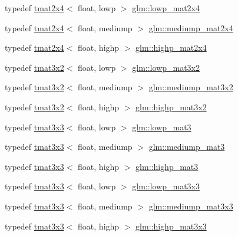 \begin{DoxyCompactItemize}
\item 
typedef \hyperlink{structglm_1_1tmat2x4}{tmat2x4}$<$ float, lowp $>$ \hyperlink{group__core__precision_gafb9e8f974dd69b38b5acc16989882aa0}{glm\+::lowp\+\_\+mat2x4}
\item 
typedef \hyperlink{structglm_1_1tmat2x4}{tmat2x4}$<$ float, mediump $>$ \hyperlink{group__core__precision_ga61617ba8393bbebc94ee813403aa54a9}{glm\+::mediump\+\_\+mat2x4}
\item 
typedef \hyperlink{structglm_1_1tmat2x4}{tmat2x4}$<$ float, highp $>$ \hyperlink{group__core__precision_ga74ae75c71c8c2b775714fb24454d6096}{glm\+::highp\+\_\+mat2x4}
\item 
typedef \hyperlink{structglm_1_1tmat3x2}{tmat3x2}$<$ float, lowp $>$ \hyperlink{group__core__precision_ga8db0631a52908b3b4805b6abeda26176}{glm\+::lowp\+\_\+mat3x2}
\item 
typedef \hyperlink{structglm_1_1tmat3x2}{tmat3x2}$<$ float, mediump $>$ \hyperlink{group__core__precision_ga2237b9bb71ea5b0d2ae07f9315ccdc28}{glm\+::mediump\+\_\+mat3x2}
\item 
typedef \hyperlink{structglm_1_1tmat3x2}{tmat3x2}$<$ float, highp $>$ \hyperlink{group__core__precision_ga5df0f5c4120d0fd47825506c86b7814c}{glm\+::highp\+\_\+mat3x2}
\item 
typedef \hyperlink{structglm_1_1tmat3x3}{tmat3x3}$<$ float, lowp $>$ \hyperlink{group__core__precision_ga35fabe40e121bf764419b1d355cbbcd2}{glm\+::lowp\+\_\+mat3}
\item 
typedef \hyperlink{structglm_1_1tmat3x3}{tmat3x3}$<$ float, mediump $>$ \hyperlink{group__core__precision_ga59f8b29bbf809530ab4c0ee97d03a4f9}{glm\+::mediump\+\_\+mat3}
\item 
typedef \hyperlink{structglm_1_1tmat3x3}{tmat3x3}$<$ float, highp $>$ \hyperlink{group__core__precision_ga5822a3dc6f6d421ee0b6a3c7f41a3ff1}{glm\+::highp\+\_\+mat3}
\item 
typedef \hyperlink{structglm_1_1tmat3x3}{tmat3x3}$<$ float, lowp $>$ \hyperlink{group__core__precision_ga8d591be4ef2bf3bbcd7473c3eadeaf55}{glm\+::lowp\+\_\+mat3x3}
\item 
typedef \hyperlink{structglm_1_1tmat3x3}{tmat3x3}$<$ float, mediump $>$ \hyperlink{group__core__precision_gae75115c4c4608fccf6827f7a25d95885}{glm\+::mediump\+\_\+mat3x3}
\item 
typedef \hyperlink{structglm_1_1tmat3x3}{tmat3x3}$<$ float, highp $>$ \hyperlink{group__core__precision_gac4db2c4ff089b960ddd5682abaa9e5d4}{glm\+::highp\+\_\+mat3x3}
\item 

\end{DoxyCompactItemize}
